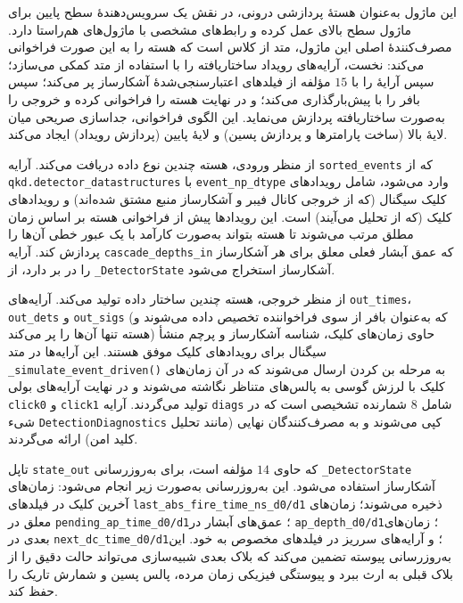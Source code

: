 این ماژول به‌عنوان هستهٔ پردازشی درونی، در نقش یک سرویس‌دهندهٔ سطح پایین برای ماژول سطح بالای  عمل کرده و رابط‌های مشخصی با ماژول‌های هم‌راستا دارد. مصرف‌کنندهٔ اصلی این ماژول، متد  از کلاس  است که هسته را به این صورت فراخوانی می‌کند: نخست، آرایه‌های رویداد ساختاریافته را با استفاده از متد کمکی  می‌سازد؛ سپس آرایهٔ  را با $15$ مؤلفه از فیلدهای اعتبارسنجی‌شدهٔ آشکارساز پر می‌کند؛ سپس بافر  را با  پیش‌بارگذاری می‌کند؛ و در نهایت هسته را فراخوانی کرده و خروجی را به‌صورت ساختاریافته پردازش می‌نماید. این الگوی فراخوانی، جداسازی صریحی میان لایهٔ بالا (ساخت پارامترها و پردازش پسین) و لایهٔ پایین (پردازش رویداد) ایجاد می‌کند.


از منظر ورودی، هسته چندین نوع داده دریافت می‌کند. آرایه \texttt{sorted\_events} که از \texttt{qkd.detector\_datastructures} با  \texttt{event\_np\_dtype} وارد می‌شود، شامل رویدادهای کلیک سیگنال (که از خروجی کانال فیبر و آشکارساز منبع مشتق شده‌اند) و رویدادهای کلیک  (که از تحلیل  می‌آیند) است. این رویدادها پیش از فراخوانی هسته بر اساس زمان مطلق مرتب می‌شوند تا هسته بتواند به‌صورت کارآمد با یک عبور خطی آن‌ها را پردازش کند. آرایه \texttt{cascade\_depths\_in} که عمق آبشار فعلی  معلق برای هر آشکارساز را در بر دارد، از \texttt{\_DetectorState} آشکارساز استخراج می‌شود.

از منظر خروجی، هسته چندین ساختار داده تولید می‌کند. آرایه‌های \texttt{out\_times}، \texttt{out\_dets} و \texttt{out\_sigs} (که به‌عنوان بافر از سوی فراخواننده تخصیص داده می‌شوند و هسته تنها آن‌ها را پر می‌کند) حاوی زمان‌های کلیک، شناسه آشکارساز و پرچم منشأ سیگنال برای رویدادهای کلیک موفق هستند. این آرایه‌ها در متد \texttt{\_simulate\_event\_driven()} به مرحله بن کردن  ارسال می‌شوند که در آن زمان‌های کلیک با لرزش گوسی به پالس‌های متناظر نگاشته می‌شوند و در نهایت آرایه‌های بولی \texttt{click0} و \texttt{click1} تولید می‌گردند. آرایه \texttt{diags} شامل $8$ شمارنده تشخیصی است که در شیء \texttt{DetectionDiagnostics} کپی می‌شوند و به مصرف‌کنندگان نهایی (مانند تحلیل کلید امن) ارائه می‌گردند.

تاپل \texttt{state\_out} که حاوی $14$ مؤلفه است، برای به‌روزرسانی \texttt{\_DetectorState} آشکارساز استفاده می‌شود. این به‌روزرسانی به‌صورت زیر انجام می‌شود: زمان‌های آخرین کلیک  در فیلدهای \texttt{last\_abs\_fire\_time\_ns\_d0/d1} ذخیره می‌شوند؛ زمان‌های  معلق  در \texttt{pending\_ap\_time\_d0/d1}؛ عمق‌های آبشار در \texttt{ap\_depth\_d0/d1}؛ زمان‌های  بعدی در \texttt{next\_dc\_time\_d0/d1}؛ و آرایه‌های سرریز  در فیلدهای مخصوص به خود. این به‌روزرسانی پیوسته تضمین می‌کند که بلاک بعدی شبیه‌سازی می‌تواند حالت دقیق را از بلاک قبلی به ارث ببرد و پیوستگی فیزیکی زمان مرده، پالس پسین و شمارش تاریک را حفظ کند.

